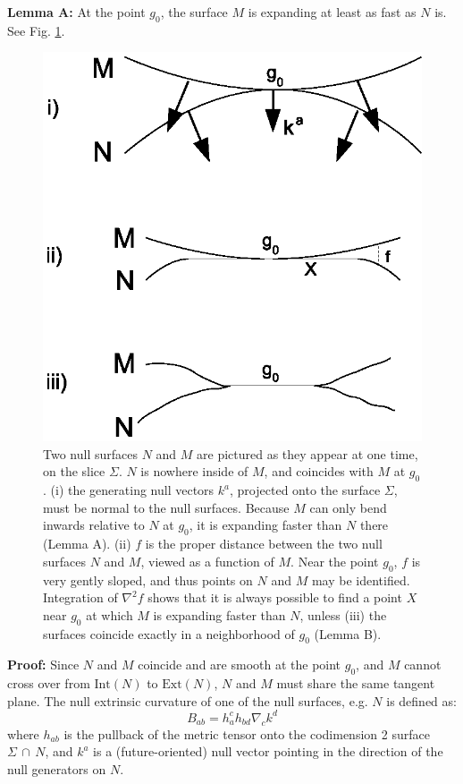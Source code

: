 \documentclass{article}
\begin{document}
\textbf{Lemma A:} At the point $g_0$, the surface $M$ is expanding at least as fast as $N$ is.  See Fig. \ref{fronts}.
\begin{figure}[hbt]
\centering
\includegraphics[width=.6\textwidth]{fronts.eps}
\caption{\small{Two null surfaces $N$ and $M$ are pictured as they appear at one time, on the slice $\Sigma$.  $N$ is nowhere inside of $M$, and coincides with $M$ at $g_0$.  (i) the generating null vectors $k^a$, projected onto the surface $\Sigma$, must be normal to the null surfaces.  Because $M$ can only bend inwards relative to $N$ at $g_0$, it is expanding faster than $N$ there (Lemma A).  (ii) $f$ is the proper distance between the two null surfaces $N$ and $M$, viewed as a function of $M$.  Near the point $g_0$, $f$ is very gently sloped, and thus points on $N$ and $M$ may be identified.  Integration of $\nabla^2 f$ shows that it is always possible to find a point $X$ near $g_0$ at which $M$ is expanding faster than $N$, unless (iii) the surfaces coincide exactly in a neighborhood of $g_0$ (Lemma B).
}}\label{fronts}
\end{figure}

\textbf{Proof:} Since $N$ and $M$ coincide and are smooth at the point $g_0$, and $M$ cannot cross over from 
$\mathrm{Int}(N)$ to $\mathrm{Ext}(N)$, $N$ and $M$ must share the same tangent plane.  The null extrinsic curvature of one of the null surfaces, e.g. $N$ is defined as:
\begin{equation}\label{B}
B_{ab} = h^c_a h_{bd} \nabla_c k^d
\end{equation} 
where $h_{ab}$ is the pullback of the metric tensor onto the codimension 2 surface $\Sigma\,\cap\,N$, and $k^a$ is a (future-oriented) null vector pointing in the direction of the null generators on $N$.  
\end{document}
